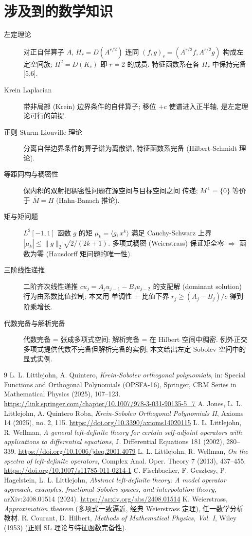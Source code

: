 \documentclass[UTF8]{ctexart}
\begin{document}
\section{涉及到的数学知识}

\begin{description}
	\item[左定理论] 对正自伴算子 $A$, $H_r = D(A^{r/2})$ 连同
		$(f,g)_r = (A^{r/2}f, A^{r/2}g)$ 构成左定空间族; $H^2 = D(K_c)$ 即
		$r = 2$ 的成员. 特征函数系在各 $H_r$ 中保持完备 [5,6].
	\item[Krein Laplacian] 带非局部 (Krein) 边界条件的自伴算子; 移位 $+c$
		使谱进入正半轴, 是左定理论可行的前提.
	\item[正则 Sturm-Liouville 理论] 分离自伴边界条件的算子谱为离散谱,
		特征函数系完备 (Hilbert-Schmidt 理论).
	\item[等距同构与稠密性] 保内积的双射把稠密性问题在源空间与目标空间之间
		传递; $M^\perp = \{0\}$ 等价于 $\overline M = H$ (Hahn-Banach 推论).
	\item[矩与矩问题] $L^2[-1,1]$ 函数 $g$ 的矩 $\mu_k = \langle g, x^k \rangle$
		满足 Cauchy-Schwarz 上界 $|\mu_k| \le \|g\|_2 \sqrt{2/(2k+1)}$.
		多项式稠密 (Weierstrass) 保证矩全零 $\Rightarrow$ 函数为零
		(Hausdorff 矩问题的唯一性).
	\item[三阶线性递推] 二阶齐次线性递推 $c u_j = A_j u_{j-1} - B_j u_{j-2}$
		的支配解 (dominant solution) 行为由系数比值控制; 本文用
		单调性 + 比值下界 $r_j \geq (A_j - B_j)/c$ 得到阶乘增长.
	\item[代数完备与解析完备] 代数完备 = 张成多项式空间; 解析完备 = 在
		Hilbert 空间中稠密. 例外正交多项式提供代数不完备但解析完备的实例;
		本文给出左定 Sobolev 空间中的显式实例.
\end{description}

\begin{thebibliography}{9}
 L. L. Littlejohn, A. Quintero, \emph{Krein-Sobolev orthogonal
	polynomials}, in: Special Functions and Orthogonal Polynomials (OPSFA-16),
	Springer, CRM Series in Mathematical Physics (2025), 107--123.
	\url{https://link.springer.com/chapter/10.1007/978-3-031-90135-5_7}
 A. Jones, L. L. Littlejohn, A. Quintero Roba, \emph{Krein-Sobolev
	Orthogonal Polynomials II}, Axioms 14 (2025), no. 2, 115.
	\url{https://doi.org/10.3390/axioms14020115}
 L. L. Littlejohn, R. Wellman, \emph{A general left-definite theory
	for certain self-adjoint operators with applications to differential equations},
	J. Differential Equations 181 (2002), 280--339.
	\url{https://doi.org/10.1006/jdeq.2001.4079}
 L. L. Littlejohn, R. Wellman, \emph{On the spectra of left-definite
	operators}, Complex Anal. Oper. Theory 7 (2013), 437--455.
	\url{https://doi.org/10.1007/s11785-011-0214-1}
 C. Fischbacher, F. Gesztesy, P. Hagelstein, L. L. Littlejohn,
	\emph{Abstract left-definite theory: A model operator approach, examples,
	fractional Sobolev spaces, and interpolation theory}, arXiv:2408.01514 (2024).
	\url{https://arxiv.org/abs/2408.01514}
 K. Weierstrass, \emph{Approximation theorem} (多项式一致逼近,
	经典 Weierstrass 定理), 任一数学分析教材.
 R. Courant, D. Hilbert, \emph{Methods of Mathematical Physics,
	Vol. I}, Wiley (1953) (正则 SL 理论与特征函数完备性).
\end{thebibliography}
\end{document}
